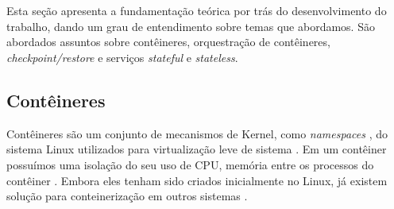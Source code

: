 

\chapter{} \label{cap:fundamentacao:teorica}

Esta seção apresenta a fundamentação teórica por trás do desenvolvimento
do trabalho, dando um grau de entendimento sobre temas que abordamos. São
abordados assuntos sobre contêineres, orquestração de contêineres,
\textit{checkpoint/restore} e serviços \textit{stateful} e \textit{stateless}.

\section{Contêineres}

Contêineres são um conjunto de mecanismos de Kernel, como \textit{namespaces}
\cite{laadan2010linux}, do sistema Linux utilizados para virtualização leve
de sistema \cite{Chen2015/10} \cite{kubernetes}. Em um contêiner possuímos
uma isolação do seu uso de CPU, memória entre os processos do contêiner
\cite{kubernetes}. Embora eles tenham sido criados inicialmente no Linux,
já existem solução para conteinerização em outros sistemas \cite{laadan2010linux}.

